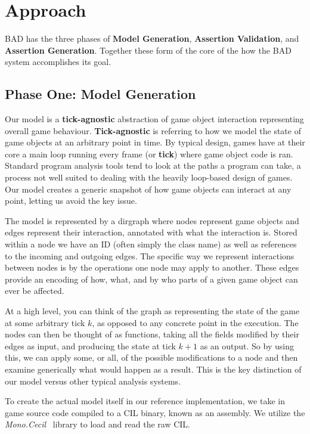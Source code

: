 \documentclass[letterpaper,twocolumn,10pt]{article}
\begin{document}
\section{Approach}

BAD has the three phases of \textbf{Model Generation}, \textbf{Assertion Validation}, and \textbf{Assertion Generation}. Together these form of the core of the how the BAD system accomplishes its goal. 

\subsection{Phase One: Model Generation}

Our model is a \textbf{tick-agnostic} abstraction of game object interaction representing overall game behaviour. \textbf{Tick-agnostic} is referring to how we model the state of game objects at an arbitrary point in time. By typical design, games have at their core a main loop running every frame (or \textbf{tick}) where game object code is ran. Standard program analysis tools tend to look at the paths a program can take, a process not well suited to dealing with the heavily loop-based design of games. Our model creates a generic snapshot of how game objects can interact at any point, letting us avoid the key issue.

The model is represented by a dirgraph where nodes represent game objects and edges represent their interaction, annotated with what the interaction is. Stored within a node we have an ID (often simply the class name) as well as references to the incoming and outgoing edges. The specific way we represent interactions between nodes is by the operations one node may apply to another. These edges provide an encoding of how, what, and by who parts of a given game object can ever be affected. 

At a high level, you can think of the graph as representing the state of the game at some arbitrary tick $k$, as opposed to any concrete point in the execution. The nodes can then be thought of as functions, taking all the fields modified by their edges as input, and producing the state at tick $k + 1$ as an output. So by using this, we can apply some, or all, of the possible modifications to a node and then examine generically what would happen as a result. This is the key distinction of our model versus other typical analysis systems.

To create the actual model itself in our reference implementation, we take in game source code compiled to a CIL binary, known as an assembly. We utilize the \textit{Mono.Cecil}~\cite{Mono.Cecil} library to load and read the raw CIL.
\end{document}
